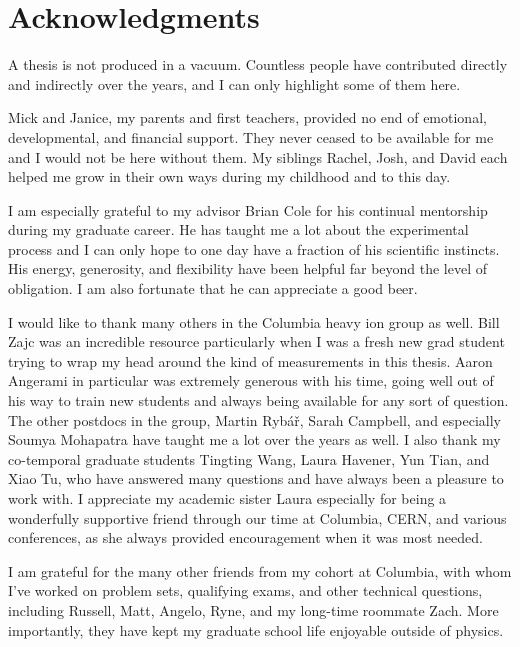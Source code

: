\chapter{Acknowledgments} %

A thesis is not produced in a vacuum.
Countless people have contributed directly and indirectly over the years, and I can only highlight some of them here.

Mick and Janice, my parents and first teachers, provided no end of emotional, developmental, and financial support.
They never ceased to be available for me and I would not be here without them.
My siblings Rachel, Josh, and David each helped me grow in their own ways during my childhood and to this day.

I am especially grateful to my advisor Brian Cole for his continual mentorship during my graduate career.
He has taught me a lot about the experimental process and I can only hope to one day have a fraction of his scientific instincts.
His energy, generosity, and flexibility have been helpful far beyond the level of obligation.
I am also fortunate that he can appreciate a good beer.

I would like to thank many others in the Columbia heavy ion group as well.
Bill Zajc was an incredible resource particularly when I was a fresh new grad student trying to wrap my head around the kind of measurements in this thesis.
Aaron Angerami in particular was extremely generous with his time, going well out of his way to train new students and always being available for any sort of question.
The other postdocs in the group, Martin Ryb\'a\v{r}, Sarah Campbell, and especially Soumya Mohapatra have taught me a lot over the years as well.
I also thank my co-temporal graduate students Tingting Wang, Laura Havener, Yun Tian, and Xiao Tu, who have answered many questions and have always been a pleasure to work with.
I appreciate my academic sister Laura especially for being a wonderfully supportive friend through our time at Columbia, CERN, and various conferences, as she always provided encouragement when it was most needed.

I am grateful for the many other friends from my cohort at Columbia, with whom I've worked on problem sets, qualifying exams, and other technical questions, including Russell, Matt, Angelo, Ryne, and my long-time roommate Zach.
More importantly, they have kept my graduate school life enjoyable outside of physics.

